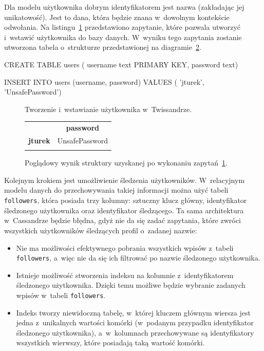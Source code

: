 Dla modelu użytkownika dobrym identyfikatorem jest nazwa (zakładając jej unikatowość). Jest to dana, która będzie znana w~dowolnym kontekście odwołania. Na listingu~\ref{lst:creating_inserting_users} przedstawiono zapytanie, które pozwala utworzyć i~wstawić użytkownika do bazy danych. W~wyniku tego zapytania zostanie utworzona tabela o~strukturze przedstawionej na diagramie~\ref{tab:creating_inserting_users_structure}. 

\begin{verbbox}
CREATE TABLE users (
    username text PRIMARY KEY,
    password text)

INSERT INTO users (username, password) VALUES (
    'jturek',
    'UnsafePassword')
\end{verbbox}

\begin{figure}[ht!]
	\centering
	\theverbbox
	\caption{Tworzenie i~wstawianie użytkownika w~Twissandrze.}
	\label{lst:creating_inserting_users}
\end{figure}

\begin{figure}[ht!]
	\centering
	\begin{tabular}{|l||c|}
		\hhline{|-||-|}
		& \textbf{password} \\
		\hhline{|~||=|}
		\textbf{jturek} & UnsafePassword \\
		\hhline{|-||-|}
	\end{tabular} 

	\caption{Poglądowy wynik struktury uzyskanej po wykonaniu zapytań~\ref{lst:creating_inserting_users}.}
	\label{tab:creating_inserting_users_structure}
\end{figure}

Kolejnym krokiem jest umożliwienie śledzenia użytkowników. W~relacyjnym modelu danych do przechowywania takiej informacji można użyć tabeli \verb+followers+, która posiada trzy kolumny: sztuczny klucz główny, identyfikator śledzonego użytkownika oraz identyfikator śledzącego. Ta sama architektura w~Cassandrze będzie błędna, gdyż nie da się zadać zapytania, które zwróci wszystkich użytkowników śledzących profil o~zadanej nazwie:

\begin{itemize}
	\item Nie ma możliwości efektywnego pobrania wszystkich wpisów z~tabeli \verb+followers+, a~więc nie da się ich filtrować po nazwie śledzonego użytkownika.
	\item Istnieje możliwość stworzenia indeksu na kolumnie z~identyfikatorem śledzonego użytkownika. Dzięki temu możliwe będzie wybranie zadanych wpisów w~tabeli \verb+followers+.
	\item Indeks tworzy niewidoczną tabelę, w~której kluczem głównym wiersza jest jedna z~unikalnych wartości komórki (w~podanym przypadku identyfikator śledzonego użytkownika), a~w~kolumnach przechowywane są identyfikatory wszystkich wierwszy, które posiadają taką wartość komórki.
\end{itemize}

